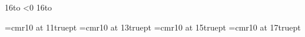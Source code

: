 \read16to\nbdigits
\newcount\n
\n\nbdigits
\ifnum\n<0
  \multiply{}
  \read16to\firstdigit
\else
  \advance{}
  \def\firstdigit{0}
\fi
\newcount\lastdigit
\lastdigit\firstdigit
\advance\lastdigit\n
\advance{}

\newcount\index
\index\lastdigit
\advance{} 
\divide{}
\def\base{10000}
\def\basesp{10000sp}

\newcount\lastplusone
\lastplusone\index
\advance{}


%

\font\xa=cmr10 at 11truept %
\fontdimen\lastplusone\xa=0sp %
\font\xb=cmr10 at 13truept %
\fontdimen\lastplusone\xb=0sp %
\font\xc=cmr10 at 15truept %
\fontdimen\lastplusone\xc=0sp %
\font\xr=cmr10 at 17truept %
\fontdimen\lastplusone\xr=0sp %




\newcount\dv       %
\newcount\firstpos %
\newcount\I        %
\newdimen\carry    %
\newdimen\x        %
\newcount\N        %
\newif\ifcont      %
\newcount\Sdv      %
\newcount\dir      %


\def\InitializeArrays{
  {
  \I=1
  \loop
      \fontdimen\I\xa=0sp
      \fontdimen\I\xb=0sp
      \fontdimen\I\xc=0sp
      \advance\I1
    \ifnum\I<\lastplusone
  \repeat
  }
  }

